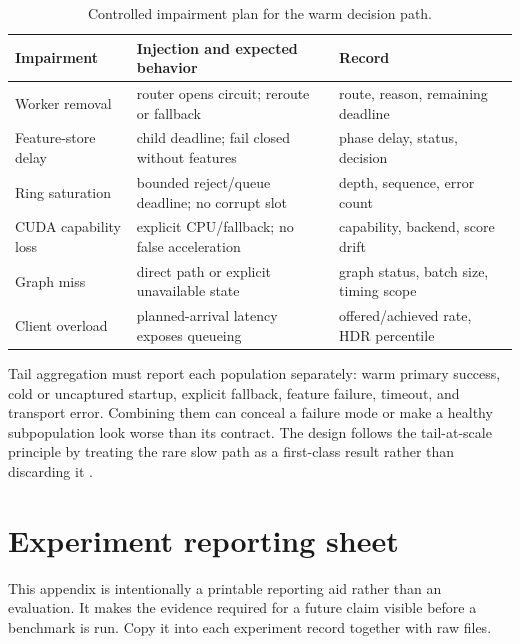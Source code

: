 \documentclass[10pt,a4paper,twocolumn]{article}
\begin{document}
\begin{table}[t]\centering\scriptsize
\caption{Controlled impairment plan for the warm decision path.}\label{tab:failures}
\begin{tabularx}{\columnwidth}{@{}lY Y@{}}\toprule
Impairment & Injection and expected behavior & Record \\\midrule
Worker removal & router opens circuit; reroute or fallback & route, reason, remaining deadline \\
Feature-store delay & child deadline; fail closed without features & phase delay, status, decision \\
Ring saturation & bounded reject/queue deadline; no corrupt slot & depth, sequence, error count \\
CUDA capability loss & explicit CPU/fallback; no false acceleration & capability, backend, score drift \\
Graph miss & direct path or explicit unavailable state & graph status, batch size, timing scope \\
Client overload & planned-arrival latency exposes queueing & offered/achieved rate, HDR percentile \\\bottomrule
\end{tabularx}\end{table}

Tail aggregation must report each population separately: warm primary success,
cold or uncaptured startup, explicit fallback, feature failure, timeout, and
transport error. Combining them can conceal a failure mode or make a healthy
subpopulation look worse than its contract. The design follows the tail-at-scale
principle by treating the rare slow path as a first-class result rather than
discarding it \cite{dean2013}.

\clearpage
\appendix
\section{Experiment reporting sheet}
This appendix is intentionally a printable reporting aid rather than an
evaluation. It makes the evidence required for a future claim visible before a
benchmark is run. Copy it into each experiment record together with raw files.
\end{document}
